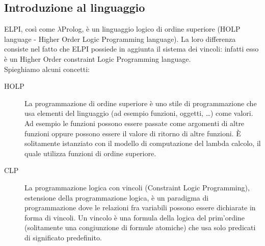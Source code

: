 \documentclass[12pt,a4paper,openright,twoside]{report}
\begin{document}
\subsection{Introduzione al linguaggio}
ELPI, così come $\lambda$Prolog, è un linguaggio logico di ordine superiore (HOLP language - Higher Order Logic Programming language). La loro differenza consiste nel fatto che ELPI possiede in aggiunta il sistema dei vincoli: infatti esso è un Higher Order constraint Logic Programming language.\\
Spieghiamo alcuni concetti:
\begin{description}
 \item[HOLP] La programmazione di ordine superiore è uno stile di programmazione che usa elementi del linguaggio (ad esempio funzioni, oggetti, \ldots) come valori. Ad esempio le funzioni possono essere passate come argomenti di altre funzioni oppure possono essere il valore di ritorno di altre funzioni. È solitamente istanziato con il modello di computazione del lambda calcolo, il quale utilizza funzioni di ordine superiore.
 \item[CLP] La programmazione logica con vincoli (Constraint Logic Programming), estensione della programmazione logica, è un paradigma di programmazione dove le relazioni fra variabili possono essere dichiarate in forma di vincoli. Un vincolo è una formula della logica del prim'ordine (solitamente una congiunzione di formule atomiche) che usa solo predicati di significato predefinito.
\end{description}
\end{document}
